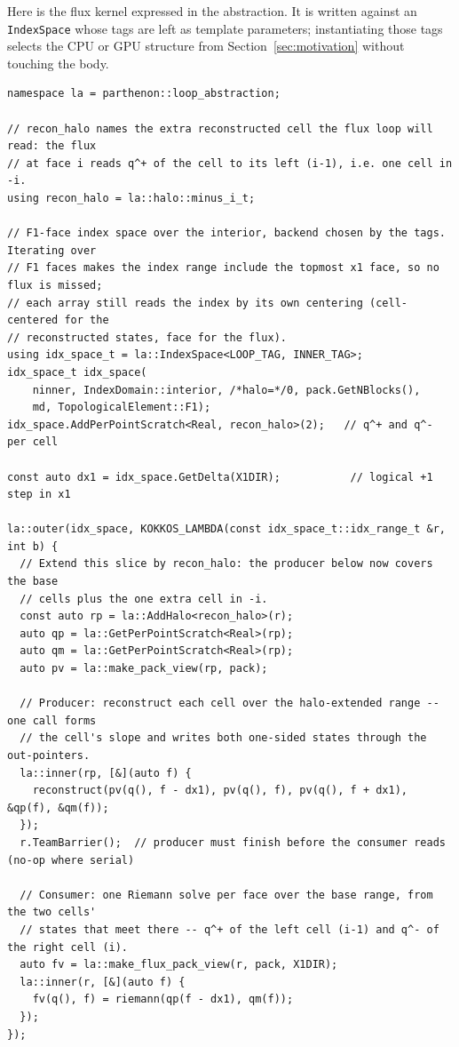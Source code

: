 \documentclass[11pt]{article}
\newcommand{\code}[1]{\lstinline[basicstyle=\ttfamily]|#1|}
\begin{document}
Here is the flux kernel expressed in the abstraction. It is written against an
\code{IndexSpace} whose tags are left as template parameters; instantiating those
tags selects the CPU or GPU structure from Section~\ref{sec:motivation} without
touching the body.

\begin{lstlisting}
namespace la = parthenon::loop_abstraction;

// recon_halo names the extra reconstructed cell the flux loop will read: the flux
// at face i reads q^+ of the cell to its left (i-1), i.e. one cell in -i.
using recon_halo = la::halo::minus_i_t;

// F1-face index space over the interior, backend chosen by the tags. Iterating over
// F1 faces makes the index range include the topmost x1 face, so no flux is missed;
// each array still reads the index by its own centering (cell-centered for the
// reconstructed states, face for the flux).
using idx_space_t = la::IndexSpace<LOOP_TAG, INNER_TAG>;
idx_space_t idx_space(
    ninner, IndexDomain::interior, /*halo=*/0, pack.GetNBlocks(),
    md, TopologicalElement::F1);
idx_space.AddPerPointScratch<Real, recon_halo>(2);   // q^+ and q^- per cell

const auto dx1 = idx_space.GetDelta(X1DIR);           // logical +1 step in x1

la::outer(idx_space, KOKKOS_LAMBDA(const idx_space_t::idx_range_t &r, int b) {
  // Extend this slice by recon_halo: the producer below now covers the base
  // cells plus the one extra cell in -i.
  const auto rp = la::AddHalo<recon_halo>(r);
  auto qp = la::GetPerPointScratch<Real>(rp);
  auto qm = la::GetPerPointScratch<Real>(rp);
  auto pv = la::make_pack_view(rp, pack);

  // Producer: reconstruct each cell over the halo-extended range -- one call forms
  // the cell's slope and writes both one-sided states through the out-pointers.
  la::inner(rp, [&](auto f) {
    reconstruct(pv(q(), f - dx1), pv(q(), f), pv(q(), f + dx1), &qp(f), &qm(f));
  });
  r.TeamBarrier();  // producer must finish before the consumer reads (no-op where serial)

  // Consumer: one Riemann solve per face over the base range, from the two cells'
  // states that meet there -- q^+ of the left cell (i-1) and q^- of the right cell (i).
  auto fv = la::make_flux_pack_view(r, pack, X1DIR);
  la::inner(r, [&](auto f) {
    fv(q(), f) = riemann(qp(f - dx1), qm(f));
  });
});
\end{lstlisting}
\end{document}
